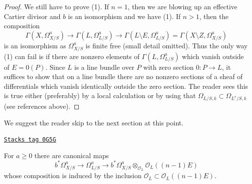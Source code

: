 \begin{proof}
\medskip\noindent
We still have to prove (1). If $n = 1$, then we are blowing
up an effective Cartier divisor and $b$ is an isomorphism
and we have (1). If $n > 1$, then the composition
$$
\Gamma(X, \Omega^a_{X/S})
\to
\Gamma(L, \Omega^a_{L/S})
\to
\Gamma(L \setminus E, \Omega^a_{L/S})
=
\Gamma(X \setminus Z, \Omega^a_{X/S})
$$
is an isomorphism as $\Omega^a_{X/S}$ is finite free
(small detail omitted). Thus the only way (1) can fail is if
there are nonzero elements of $\Gamma(L, \Omega^a_{L/S})$ which vanish
outside of $E = 0(P)$. Since $L$ is a line bundle over $P$
with zero section $0 : P \to L$, it suffices to show that
on a line bundle there are no nonzero sections of a sheaf
of differentials which vanish identically outside the zero section.
The reader sees this is true either (preferably) by a local calculation
or by using that $\Omega_{L/S, k} \subset \Omega_{L^\star/S, k}$
(see references above).
\end{proof}

We suggest the reader skip to the next section at this point.

\begin{lemma}
\label{derham-lemma-comparison-bis}
\href{https://stacks.math.columbia.edu/tag/0G5G}{\texttt{Stacks tag 0G5G}}

For $a \geq 0$ there are canonical maps
$$
b^*\Omega^a_{X/S} \longrightarrow
\Omega^a_{L/S} \longrightarrow
b^*\Omega^a_{X/S} \otimes_{\mathcal{O}_L} \mathcal{O}_L((n - 1)E)
$$
whose composition is induced by the inclusion
$\mathcal{O}_L \subset \mathcal{O}_L((n - 1)E)$.
\end{lemma}

